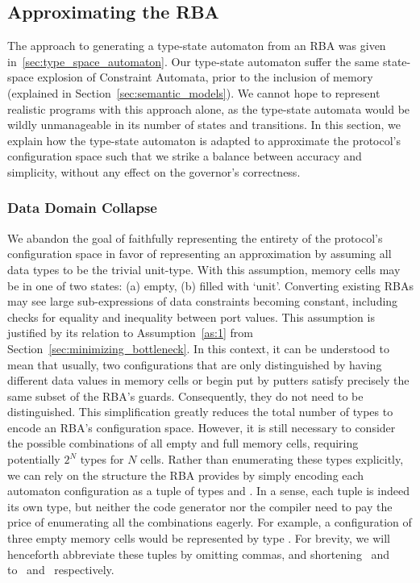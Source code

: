 \subsection{Approximating the RBA}
The approach to generating a type-state automaton from an RBA was given in~\ref{sec:type_space_automaton}. Our type-state automaton suffer the same state-space explosion of Constraint Automata, prior to the inclusion of memory (explained in Section~\ref{sec:semantic_models}). We cannot hope to represent realistic programs with this approach alone, as the type-state automata would be wildly unmanageable in its number of states and transitions. In this section, we explain how the type-state automaton is adapted to approximate the protocol's configuration space such that we strike a balance between accuracy and simplicity, without any effect on the governor's correctness.

\subsubsection{Data Domain Collapse}
\label{sec:approximating_rba}
We abandon the goal of faithfully representing the entirety of the protocol's configuration space in favor of representing an approximation by assuming all data types to be the trivial unit-type. With this assumption, memory cells may be in one of two states: (a) empty, (b) filled with `unit'. Converting existing RBAs may see large sub-expressions of data constraints becoming constant, including checks for equality and inequality between port values. This assumption is justified by its relation to Assumption~\ref{as:1} from Section~\ref{sec:minimizing_bottleneck}. In this context, it can be understood to mean that usually, two configurations that are only distinguished by having different data values in memory cells or begin put by putters satisfy precisely the same subset of the RBA's guards. Consequently, they do not need to be distinguished. This simplification greatly reduces the total number of types to encode an RBA's configuration space. However, it is still necessary to consider the possible combinations of all empty and full memory cells, requiring potentially $2^N$ types for $N$ cells. Rather than enumerating these types explicitly, we can rely on the structure the RBA provides by simply encoding each automaton configuration as a tuple of types  and . In a sense, each tuple is indeed its own type, but neither the code generator nor the compiler need to pay the price of enumerating all the combinations eagerly. For example, a configuration of three empty memory cells would be represented by type . For brevity, we will henceforth abbreviate these tuples by omitting commas, and shortening~ and~ to~ and~ respectively.


